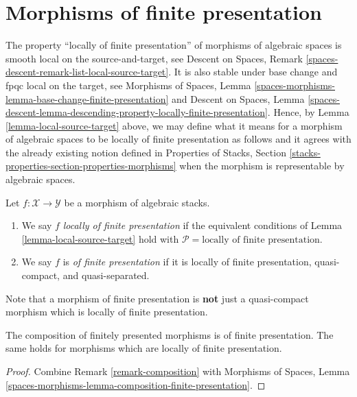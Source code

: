 \section{Morphisms of finite presentation}
\label{section-finite-presentation}

\noindent
The property ``locally of finite presentation'' of morphisms of algebraic
spaces is smooth local on the source-and-target, see
Descent on Spaces, Remark \ref{spaces-descent-remark-list-local-source-target}.
It is also stable under base change and fpqc local on the target, see
Morphisms of Spaces,
Lemma \ref{spaces-morphisms-lemma-base-change-finite-presentation}
and
Descent on Spaces, Lemma
\ref{spaces-descent-lemma-descending-property-locally-finite-presentation}.
Hence, by
Lemma \ref{lemma-local-source-target}
above, we may define what it means for a morphism of algebraic spaces
to be locally of finite presentation as follows and it agrees with the already
existing notion defined in
Properties of Stacks,
Section \ref{stacks-properties-section-properties-morphisms}
when the morphism is representable by algebraic spaces.

\begin{definition}
\label{definition-locally-finite-presentation}
Let $f : \mathcal{X} \to \mathcal{Y}$ be a morphism of algebraic stacks.
\begin{enumerate}
\item We say $f$
{\it locally of finite presentation} if the equivalent conditions of
Lemma \ref{lemma-local-source-target}
hold with
$\mathcal{P} = \text{locally of finite presentation}$.
\item We say $f$ is
{\it of finite presentation} if it is locally of finite presentation,
quasi-compact, and quasi-separated.
\end{enumerate}
\end{definition}

\noindent
Note that a morphism of finite presentation is {\bf not} just a quasi-compact
morphism which is locally of finite presentation.

\begin{lemma}
\label{lemma-composition-finite-presentation}
The composition of finitely presented morphisms is of finite presentation.
The same holds for morphisms which are locally of finite presentation.
\end{lemma}

\begin{proof}
Combine
Remark \ref{remark-composition}
with
Morphisms of Spaces, Lemma
\ref{spaces-morphisms-lemma-composition-finite-presentation}.
\end{proof}

